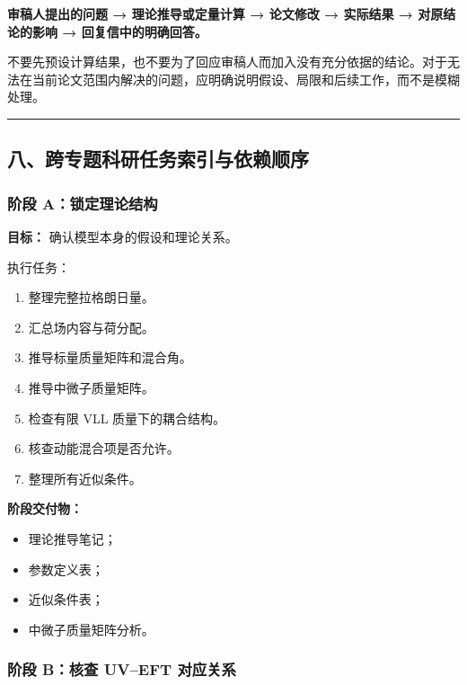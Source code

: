 \documentclass[
  chinese,
  UTF8]{ctexart}
\providecommand{\tightlist}{%
  \setlength{\itemsep}{0pt}\setlength{\parskip}{0pt}}
\begin{document}
\textbf{审稿人提出的问题 → 理论推导或定量计算 → 论文修改 → 实际结果 →
对原结论的影响 → 回复信中的明确回答。}

不要先预设计算结果，也不要为了回应审稿人而加入没有充分依据的结论。对于无法在当前论文范围内解决的问题，应明确说明假设、局限和后续工作，而不是模糊处理。

\begin{center}\rule{0.5\linewidth}{0.5pt}\end{center}

\subsection{八、跨专题科研任务索引与依赖顺序}\label{ux516bux8de8ux4e13ux9898ux79d1ux7814ux4efbux52a1ux7d22ux5f15ux4e0eux4f9dux8d56ux987aux5e8f}

\subsubsection{阶段
A：锁定理论结构}\label{ux9636ux6bb5-aux9501ux5b9aux7406ux8bbaux7ed3ux6784}

\textbf{目标：} 确认模型本身的假设和理论关系。

执行任务：

\begin{enumerate}
\def\labelenumi{\arabic{enumi}.}
\tightlist
\item
  整理完整拉格朗日量。
\item
  汇总场内容与荷分配。
\item
  推导标量质量矩阵和混合角。
\item
  推导中微子质量矩阵。
\item
  检查有限 VLL 质量下的耦合结构。
\item
  核查动能混合项是否允许。
\item
  整理所有近似条件。
\end{enumerate}

\textbf{阶段交付物：}

\begin{itemize}
\tightlist
\item
  理论推导笔记；
\item
  参数定义表；
\item
  近似条件表；
\item
  中微子质量矩阵分析。
\end{itemize}

\subsubsection{阶段 B：核查 UV--EFT
对应关系}\label{ux9636ux6bb5-bux6838ux67e5-uveft-ux5bf9ux5e94ux5173ux7cfb}
\end{document}

